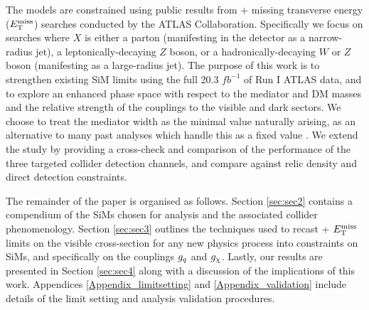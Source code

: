 The models are constrained using public results from \monoX + missing transverse energy ($E_{\mathrm{T}}^{\mathrm{miss}}$) searches conducted by the ATLAS Collaboration. Specifically we focus on searches where $X$ is either a parton (manifesting in the detector as a narrow-radius jet), a leptonically-decaying $Z$ boson, or a hadronically-decaying $W$ or $Z$ boson (manifesting as a large-radius jet). The purpose of this work is to strengthen existing SiM limits \cite{} using the full 20.3 $fb^{-1}$ of Run I ATLAS data, and to explore an enhanced phase space with respect to the mediator and DM masses and the relative strength of the couplings to the visible and dark sectors.
We choose to treat the mediator width as the minimal value naturally arising, as an alternative to many past analyses which handle this as a fixed value \cite{}. We extend the study by providing a cross-check and comparison of the performance of the three targeted collider detection channels, and compare against relic density and direct detection constraints.

The remainder of the paper is organised as follows. Section \ref{sec:sec2} contains a compendium of the SiMs chosen for analysis and the associated collider phenomenology. Section \ref{sec:sec3} outlines the techniques used to recast \monoX + $E_{\mathrm{T}}^{\mathrm{miss}}$ limits on the visible cross-section for any new physics process into constraints on SiMs, and specifically on the couplings $g_q$ and $g_{\chi}$. Lastly, our results are presented in Section \ref{sec:sec4} along with a discussion of the implications of this work. Appendices \ref{Appendix_limitsetting} and \ref{Appendix_validation} include  details of the limit setting and analysis validation procedures.
